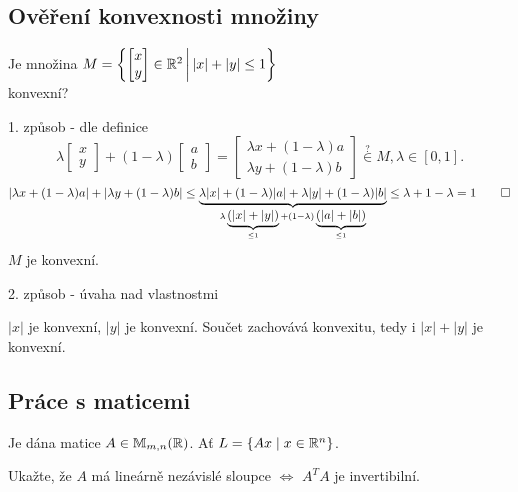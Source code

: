 \subsection{Ověření konvexnosti množiny}
\begin{multicols}{2}
    Je množina $M = \left\lbrace 
    \begin{bmatrix}
        x \\
        y
    \end{bmatrix} \in \mathbb{R}^2 \, \middle| \, |x| + |y| \leq 1 \right\rbrace$ \\ konvexní?

\columnbreak
\end{multicols}
1. způsob - dle definice
\[
    \lambda 
    \begin{bmatrix}
        x\\
        y     
    \end{bmatrix} + (1-\lambda)
    \begin{bmatrix}
        a\\
        b
    \end{bmatrix} = 
    \begin{bmatrix}
        \lambda x  + (1-\lambda) a \\
        \lambda y + (1-\lambda) b
    \end{bmatrix} \overset{?}{\in} M, \lambda \in [0,1].
\]
\[
    |\lambda x + (1-\lambda)a| + |\lambda y + (1-\lambda)b| \leq 
    \underbrace{\lambda |x| + (1-\lambda)|a| + \lambda |y| + (1-\lambda)|b|}_{\lambda
    \underbrace{(|x|+|y|)}_{\leq1} + (1-\lambda)\underbrace{(|a|+|b|)}_{\leq 1}} \leq \lambda + 1 - \lambda = 1 \qed
\]
$M$ je konvexní.

2. způsob - úvaha nad vlastnostmi

$|x|$ je konvexní, $|y|$ je konvexní. Součet zachovává konvexitu, tedy i $|x| + |y|$ je konvexní.

\subsection{Práce s maticemi}
Je dána matice $A \in \mathbb{M}_{m,n} (\mathbb{R})$. Ať $L = \left\lbrace Ax \mid x \in \mathbb{R}^n \right\rbrace$. 

Ukažte, že $A$ má lineárně nezávislé sloupce $\iff$ $A^T A$ je invertibilní.

